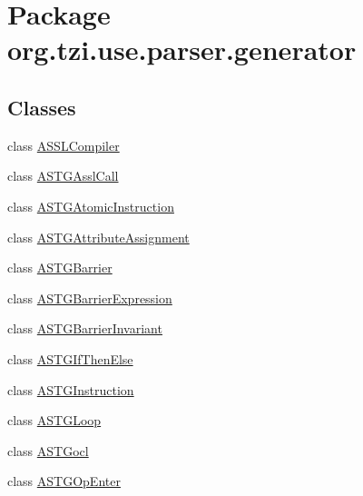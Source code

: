 \hypertarget{namespaceorg_1_1tzi_1_1use_1_1parser_1_1generator}{\section{Package org.\-tzi.\-use.\-parser.\-generator}
\label{namespaceorg_1_1tzi_1_1use_1_1parser_1_1generator}
}
\subsection*{Classes}
\begin{DoxyCompactItemize}
\item 
class \hyperlink{classorg_1_1tzi_1_1use_1_1parser_1_1generator_1_1_a_s_s_l_compiler}{A\-S\-S\-L\-Compiler}
\item 
class \hyperlink{classorg_1_1tzi_1_1use_1_1parser_1_1generator_1_1_a_s_t_g_assl_call}{A\-S\-T\-G\-Assl\-Call}
\item 
class \hyperlink{classorg_1_1tzi_1_1use_1_1parser_1_1generator_1_1_a_s_t_g_atomic_instruction}{A\-S\-T\-G\-Atomic\-Instruction}
\item 
class \hyperlink{classorg_1_1tzi_1_1use_1_1parser_1_1generator_1_1_a_s_t_g_attribute_assignment}{A\-S\-T\-G\-Attribute\-Assignment}
\item 
class \hyperlink{classorg_1_1tzi_1_1use_1_1parser_1_1generator_1_1_a_s_t_g_barrier}{A\-S\-T\-G\-Barrier}
\item 
class \hyperlink{classorg_1_1tzi_1_1use_1_1parser_1_1generator_1_1_a_s_t_g_barrier_expression}{A\-S\-T\-G\-Barrier\-Expression}
\item 
class \hyperlink{classorg_1_1tzi_1_1use_1_1parser_1_1generator_1_1_a_s_t_g_barrier_invariant}{A\-S\-T\-G\-Barrier\-Invariant}
\item 
class \hyperlink{classorg_1_1tzi_1_1use_1_1parser_1_1generator_1_1_a_s_t_g_if_then_else}{A\-S\-T\-G\-If\-Then\-Else}
\item 
class \hyperlink{classorg_1_1tzi_1_1use_1_1parser_1_1generator_1_1_a_s_t_g_instruction}{A\-S\-T\-G\-Instruction}
\item 
class \hyperlink{classorg_1_1tzi_1_1use_1_1parser_1_1generator_1_1_a_s_t_g_loop}{A\-S\-T\-G\-Loop}
\item 
class \hyperlink{classorg_1_1tzi_1_1use_1_1parser_1_1generator_1_1_a_s_t_gocl}{A\-S\-T\-Gocl}
\item 
class \hyperlink{classorg_1_1tzi_1_1use_1_1parser_1_1generator_1_1_a_s_t_g_op_enter}{A\-S\-T\-G\-Op\-Enter}

\end{DoxyCompactItemize}
